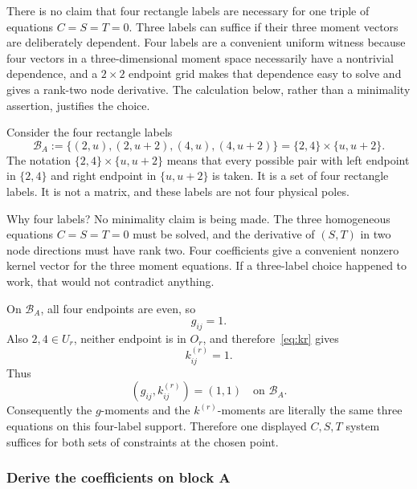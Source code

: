 \documentclass[11pt]{article}
\theoremstyle{definition}
\begin{document}
There is no claim that four rectangle labels are necessary for one triple of equations $C=S=T=0$.  Three labels can suffice if their three moment vectors are deliberately dependent.  Four labels are a convenient uniform witness because four vectors in a three-dimensional moment space necessarily have a nontrivial dependence, and a $2\times2$ endpoint grid makes that dependence easy to solve and gives a rank-two node derivative.  The calculation below, rather than a minimality assertion, justifies the choice.

Consider the four rectangle labels
\begin{equation}
\mathcal B_A:=\{(2,u),(2,u+2),(4,u),(4,u+2)\}
=\{2,4\}\times\{u,u+2\}.
\label{eq:blockA}
\end{equation}
The notation $\{2,4\}\times\{u,u+2\}$ means that every possible
pair with left endpoint in $\{2,4\}$ and right endpoint in
$\{u,u+2\}$ is taken.  It is a set of four rectangle labels.  It is not a matrix,
and these labels are not four physical poles.

Why four labels?  No minimality claim is being made.  The three homogeneous
equations $C=S=T=0$ must be solved, and the derivative of
$(S,T)$ in two node directions must have rank two.  Four coefficients give a
convenient nonzero kernel vector for the three moment equations.  If a
three-label choice happened to work, that would not contradict anything.

On $\mathcal B_A$, all four endpoints are even, so
\[
g_{ij}=1.
\]
Also $2,4\in U_r$, neither endpoint is in $O_r$, and therefore~\eqref{eq:kr} gives
\[
k^{(r)}_{ij}=1.
\]
Thus
\begin{equation}
(g_{ij},k^{(r)}_{ij})=(1,1)
\quad\text{on }\mathcal B_A.
\label{eq:weightsA}
\end{equation}
Consequently the $g$-moments and the $k^{(r)}$-moments are literally the
same three equations on this four-label support.  Therefore one displayed
$C,S,T$ system suffices for both sets of constraints at the chosen point.

\subsubsection{Derive the coefficients on block A}
\end{document}
